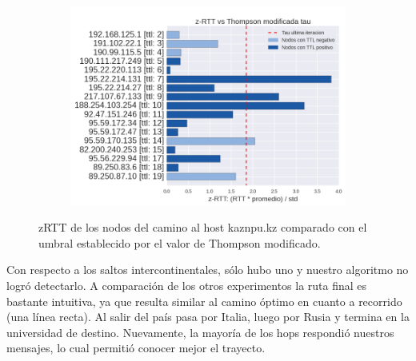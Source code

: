 \begin{figure}[h]
  \begin{subfigure}[b]{.5\textwidth}
    \includegraphics[width=\textwidth]{Imagenes/kazajistan_zrtts.png}
  \end{subfigure}
  \label{fig:kazajthan_zrtts}
  \caption{zRTT de los nodos del camino al host kaznpu.kz comparado con el umbral establecido por el valor de Thompson modificado.}
\end{figure}

\par Con respecto a los saltos intercontinentales, sólo hubo uno y nuestro algoritmo no logró detectarlo. A comparación de los otros experimentos la ruta final es bastante intuitiva, ya que resulta similar al camino óptimo en cuanto a recorrido (una línea recta). Al salir del país pasa por Italia, luego por Rusia y termina en la universidad de destino. Nuevamente, la mayoría de los hops respondió nuestros mensajes, lo cual permitió conocer mejor el trayecto.
